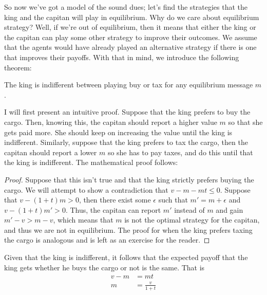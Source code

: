 So now we've got a model of the sound dues; let's find the strategies that the king and the capitan will play in equilibrium. Why do we care about equilibrium strategy? Well, if we're out of equilibrium, then it means that either the king or the capitan can play some other strategy to improve their outcomes. We assume that the agents would have already played an alternative strategy if there is one that improves their payoffs. With that in mind, we introduce the following theorem:

\begin{theorem}
    The king is indifferent between playing buy or tax for any equilibrium message $m$.
\end{theorem}
I will first present an intuitive proof. Suppose that the king prefers to buy the cargo. Then, knowing this, the capitan should report a higher value $m$ so that she gets paid more. She should keep on increasing the value until the king is indifferent. Similarly, suppose that the king prefers to tax the cargo, then the capitan should report a lower $m$ so she has to pay taxes, and do this until that the king is indifferent. The mathematical proof follows:
\begin{proof}
    Suppose that this isn't true and that the king strictly prefers buying the cargo. We will attempt to show a contradiction that $v - m - mt \leq 0$. Suppose that $v - (1 + t)m > 0$, then there exist some $\epsilon$ such that $m' = m + \epsilon$ and $v - (1 + t)m' > 0$. Thus, the capitan can report $m'$ instead of $m$ and gain $m'-v > m - v$, which means that $m$ is not the optimal strategy for the capitan, and thus we are not in equilibrium. The proof for when the king prefers taxing the cargo is analogous and is left as an exercise for the reader. 
\end{proof}

Given that the king is indifferent, it follows that the expected payoff that the king gets whether he buys the cargo or not is the same. That is
\begin{align*}
    v - m &= mt \\
    m &= \frac{v}{1 + t}
\end{align*}


